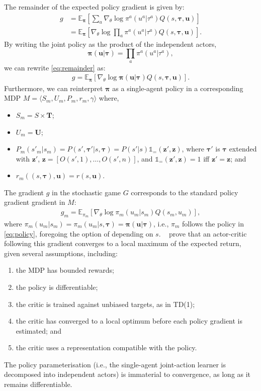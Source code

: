 \documentclass[letterpaper]{article}
\newcommand{\citet}[1]{\citeauthor{#1}~\shortcite{#1}}
\newcommand{\myvec}[1]{\mathbf{#1}}
\newcommand{\myvecsym}[1]{\boldsymbol{#1}}
\newcommand{\vpi}{\myvecsym{\pi}}
\newcommand{\vtau}{\myvecsym{\tau}}
\newcommand{\vu}{\myvec{u}}
\newcommand{\vz}{\myvec{z}}
\newcommand{\vT}{\myvec{T}}
\newcommand{\vU}{\myvec{U}}
\newcommand{\E}{\mathbb{E}}
\providecommand{\sw}[1]{{\color{red}SW: #1}}
\begin{document}
The remainder of the expected policy gradient is given by:
\begin{align}
g &= \E_{\vpi} \left[ \sum_a \nabla_\theta \log
\pi^a(u^a | \tau^a)
Q(s,\vtau, \vu) \right] \\
\label{eq:remainder}
&= \E_{\vpi} \left[ \nabla_\theta \log \prod_a 
\pi^a(u^a | \tau^a)
Q(s,\vtau, \vu) \right].
\end{align}
By writing the joint policy as the product of the independent actors,
\begin{equation}
\label{eq:policy}
\vpi(\vu|\vtau) = \prod_a \pi^a(u^a | \tau^a),
\end{equation}
we can rewrite \eqref{eq:remainder} as:
\begin{align}
\label{eq:joint}
g = \E_{\vpi} \left[ \nabla_\theta \log \vpi(\vu|\vtau) 
Q(s,\vtau, \vu) \right].
\end{align}
%
Furthermore, we can reinterpret $\vpi$ as a single-agent policy in a corresponding MDP $M=\langle S_m,U_m,P_m,r_m,\gamma\rangle$ where, 
\begin{itemize}
    \item $S_m=S\times \vT$; 
    \item $U_m=\vU$;
    \item $P_m(s'_{m}|s_m) = P(s',\vtau'|s,\vtau) = P(s'|s)\mathds{1}_=(\vz',\vz)$, where $\vtau'$ is $\vtau$ extended with $\vz'$, $\vz=\left[O(s',1),\ldots,O(s',n)\right]$, and $\mathds{1}_=(\vz',\vz) = 1$ iff $\vz'=\vz$; and
    \item $r_m((s,\vtau),\vu) = r(s,\vu)$.
\end{itemize}
%
The gradient $g$ in the stochastic game $G$ corresponds to the standard policy gradient gradient in $M$:
\begin{align}
\label{eq:KT}
g_m = \E_{\pi_m} \left[ \nabla_\theta \log \pi_m(u_m|s_m) 
Q(s_m,u_m) \right],
\end{align}
where $\pi_m(u_m|s_m) = \pi_m(u_m|s,\vtau) = \vpi(\vu|\vtau)$, i.e., $\pi_m$ follows the policy in \eqref{eq:policy}, foregoing the option of depending on $s$. 
\citet{sutton1999policy} prove that an actor-critic 
following this gradient converges to a local maximum of the expected return, given several assumptions, including:
\begin{enumerate}[leftmargin=3em]
    \item the MDP has bounded rewards;
    \item the policy is differentiable;
    \item the critic is trained against unbiased targets, as in TD(1);
    \item the critic has converged to a local optimum before each policy gradient is estimated; and
	\item the critic uses a representation compatible with the policy.
\end{enumerate}
The policy parameterisation (i.e., the single-agent joint-action learner is decomposed into 
independent actors) is immaterial to convergence, as long as it remains 
differentiable. %
\end{document}
